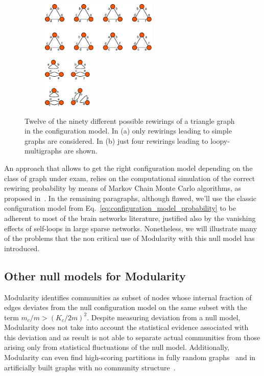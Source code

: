 \begin{figure}[htb]\centering
\begin{subfigure}[t]{0.45\textwidth}\centering
\includegraphics[height=2.4cm]{images/configuration_model_six_stubs.pdf}
\caption{}
\label{fig:reshuffle_simple_graphs}
\end{subfigure}
\begin{subfigure}[t]{0.45\textwidth}\centering
\includegraphics[height=2.4cm]{images/configuration_model_three_stubs.pdf}
\caption{}
\label{fig:reshuffle_loopy_multigraphs}
\end{subfigure}
\caption{Twelve of the ninety different possible rewirings of a triangle graph in the configuration model. In (a) only rewirings leading to simple graphs are considered. In (b) just four rewirings leading to loopy-multigraphs are shown.}
\label{fig:configuration_model_stubs}
\end{figure}
An approach that allows to get the right configuration model depending on the class of graph under exam, relies on the computational simulation of the correct rewiring probability by means of Markov Chain Monte Carlo algorithms, as proposed in~\cite{Fosdick2016}.
In the remaining paragraphs, although flawed, we'll use the classic configuration model from Eq.~\ref{eq:configuration_model_probability} to be adherent to most of the brain networks literature, justified also by the vanishing effects of self-loops in large sparse networks. Nonetheless, we will illustrate many of the problems that the non critical use of Modularity with this null model has introduced.

\subsection{Other null models for Modularity}
Modularity identifies communities as subset of nodes whose internal fraction of edges deviates from the null configuration model on the same subset with the term $m_c/m > (K_c/2m)^2$.
Despite measuring deviation from a null model, Modularity does not take into account the statistical evidence associated with this deviation and as result is not able to separate actual communities from those arising only from statistical fluctuations of the null model. Additionally, Modularity can even find high-scoring partitions in fully random graphs~\cite{Guimera2004} and in artificially built graphs with no community structure~\cite{kehagias2013}.

